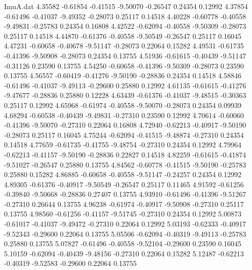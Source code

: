 \begin{filecontents}{ImuA.dat}
   4.35582   -0.61854   -0.41515   -9.50070   -0.26547    0.24354    0.12992
   4.37854   -0.61496   -0.41037   -9.49352   -0.28073    0.25117    0.14518
   4.40228   -0.60778   -0.40558   -9.49831   -0.25783    0.24354    0.16808
   4.42522   -0.62094   -0.40558   -9.50309   -0.28073    0.25117    0.14518
   4.44870   -0.61376   -0.40558   -9.50549   -0.26547    0.25117    0.16045
   4.47231   -0.60658   -0.40678   -9.51147   -0.28073    0.22064    0.15282
   4.49531   -0.61735   -0.41396   -9.50908   -0.28073    0.24354    0.13755
   4.51936   -0.61615   -0.40439   -9.51147   -0.31126    0.23590    0.13755
   4.54250   -0.60658   -0.41396   -9.50309   -0.28073    0.23590    0.13755
   4.56557   -0.60419   -0.41276   -9.50190   -0.28836    0.24354    0.14518
   4.58846   -0.61496   -0.41037   -9.49113   -0.29600    0.25880    0.12992
   4.61135   -0.61615   -0.41276   -9.47677   -0.28836    0.25880    0.12228
   4.63439   -0.61376   -0.41037   -9.48515   -0.30363    0.25117    0.12992
   4.65968   -0.61974   -0.40558   -9.50070   -0.28073    0.24354    0.09939
   4.68294   -0.60538   -0.40439   -9.49831   -0.27310    0.23590    0.12992
   4.70614   -0.60060   -0.41396   -9.50070   -0.27310    0.22064    0.16808
   4.72940   -0.62213   -0.40917   -9.50190   -0.28073    0.25117    0.16045
   4.75244   -0.62094   -0.41515   -9.48874   -0.27310    0.24354    0.14518
   4.77659   -0.61735   -0.41755   -9.48754   -0.27310    0.24354    0.12992
   4.79964   -0.62213   -0.41157   -9.50190   -0.28836    0.22827    0.14518
   4.82259   -0.61615   -0.41874   -9.51027   -0.26547    0.25880    0.13755
   4.84562   -0.60778   -0.41515   -9.50190   -0.25783    0.25880    0.15282
   4.86885   -0.60658   -0.40558   -9.51147   -0.24257    0.24354    0.12992
   4.89305   -0.61376   -0.40917   -9.50549   -0.26547    0.25117    0.11465
   4.91592   -0.61256   -0.39840   -9.50668   -0.28836    0.27407    0.13755
   4.93910   -0.61496   -0.41396   -9.51267   -0.27310    0.26644    0.13755
   4.96238   -0.61974   -0.40917   -9.50908   -0.27310    0.25117    0.13755
   4.98560   -0.61256   -0.41157   -9.51745   -0.27310    0.24354    0.12992
   5.00873   -0.61017   -0.41037   -9.49472   -0.27310    0.22064    0.12992
   5.03193   -0.62333   -0.40917   -9.52343   -0.29600    0.22064    0.13755
   5.05506   -0.62094   -0.40319   -9.49113   -0.25783    0.25880    0.13755
   5.07827   -0.61496   -0.40558   -9.52104   -0.29600    0.23590    0.16045
   5.10159   -0.62094   -0.40439   -9.48156   -0.27310    0.22064    0.15282
   5.12487   -0.62213   -0.40319   -9.52583   -0.29600    0.22064    0.13755

\end{filecontents}
